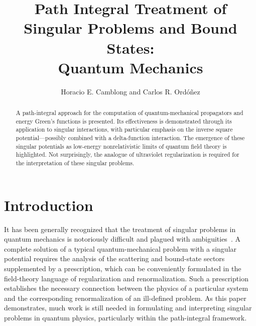 \documentclass[a4paper,preprint,draft,showpacs,amsmath,amsfonts,amssymb,aps,prd]{revtex4}%
\begin{document}
\title{Path Integral Treatment of 
 Singular Problems and Bound States:
\\
Quantum Mechanics}
                                                                               
\author{
Horacio E. Camblong\coordHE{}
and
Carlos R. Ord\'{o}\~{n}ez\coordHE{}}



\begin{abstract}
A path-integral approach for the computation of quantum-mechanical 
propagators and energy Green's functions is presented.
Its effectiveness is demonstrated through its application to singular interactions, with particular 
emphasis on the inverse square potential---possibly combined with a delta-function interaction.
The emergence of these singular potentials as low-energy nonrelativistic limits of
quantum field theory is highlighted.
Not surprisingly, the analogue of ultraviolet regularization is required
for the interpretation of these singular problems.
\end{abstract}


\maketitle



\section{Introduction}
\label{sec:introduction}


It has been generally recognized
that the treatment of singular problems in quantum mechanics is 
notoriously difficult and plagued with ambiguities~\cite{fra:71}.
A complete solution of a typical quantum-mechanical problem with a singular potential requires 
the analysis of the scattering and bound-state sectors supplemented by
a prescription, which can be conveniently formulated in the field-theory language 
of regularization and renormalization. 
Such a prescription
establishes the necessary connection between the physics of
a particular system and the corresponding renormalization of an ill-defined problem.
As this paper demonstrates,
much work is still needed in formulating and interpreting
singular problems in quantum physics,
 particularly within the path-integral framework.
\end{document}
